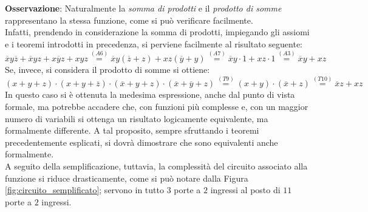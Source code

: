 \documentclass[a4paper]{extarticle}
\begin{document}
\noindent
\textbf{Osservazione}: Naturalmente la \emph{somma di prodotti} e il \emph{prodotto di somme} rappresentano la stessa funzione, come si può verificare facilmente.\\
Infatti, prendendo in considerazione la somma di prodotti, impiegando gli assiomi e i teoremi introdotti in precedenza, si perviene facilmente al risultato seguente:
\[\overline{x}y\overline{z} + \overline{x}yz + x\overline{y}z + xyz \overset{(A6)}{=} \overline{x}y(\overline{z} + z) + xz(\overline{y} + y) \overset{(A7)}{=} \overline{x}y \cdot 1 + xz \cdot 1 \overset{(A3)}{=} \overline{x}y + xz\]
Se, invece, si considera il prodotto di somme si ottiene:
\[(x + y + z) \cdot (x + y + \overline{z}) \cdot (\overline{x} + y + z) \cdot (\overline{x} + \overline{y} + z) \overset{(T9)}{=} (x + y) \cdot (\overline{x} + z) \overset{(T10)}{=} \overline{x}z + xz\]
In questo caso si è ottenuta la medesima espressione, anche dal punto di vista formale, ma potrebbe accadere che, con funzioni più complesse e, con un maggior numero di variabili si ottenga un risultato logicamente equivalente, ma formalmente differente. A tal proposito, sempre sfruttando i teoremi precedentemente esplicati, si dovrà dimostrare che sono equivalenti anche formalmente.\\
A seguito della semplificazione, tuttavia, la complessità del circuito associato alla funzione si riduce drasticamente, come si può notare dalla Figura \ref{fig:circuito_semplificato}; servono in tutto \(3\) porte a \(2\) ingressi al posto di \(11\) porte a \(2\) ingressi.\\
\end{document}

